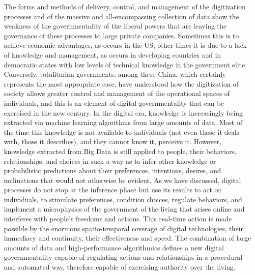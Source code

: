 The forms and methods of delivery, control, and management of the digitization processes and of the massive and all-encompassing collection of data show the weakness of the governmentality of the liberal powers that are leaving the governance of these processes to large private companies. Sometimes this is to achieve economic advantages, as occurs in the US, other times it is due to a lack of knowledge and management, as occurs in developing countries and in democratic states with low levels of technical knowledge in the government elite. Conversely, totalitarian governments, among these China, which certainly represents the most appropriate case, have understood how the digitization of society allows greater control and management of the operational spaces of individuals, and this is an element of digital governmentality that can be exercised in the new century. In the digital era, knowledge is increasingly being extracted via machine learning algorithms from large amounts of data. Most of the time this knowledge is not available to individuals (not even those it deals with, those it describes), and they cannot know it, perceive it. However, knowledge extracted from Big Data is still applied to people, their behaviors, relationships, and choices in such a way as to infer other knowledge or probabilistic predictions about their preferences, intentions, desires, and inclinations that would not otherwise be evident. As we have discussed, digital processes do not stop at the inference phase but use its results to act on individuals, to stimulate preferences, condition choices, regulate behaviors, and implement a microphysics of the government of the living that arises online and interferes with people's freedoms and actions. This real-time action is made possible by the enormous spatio-temporal coverage of digital technologies, their immediacy and continuity, their effectiveness and speed. The combination of large amounts of data and high-performance algorithmics defines a new digital governmentality capable of regulating actions and relationships in a procedural and automated way, therefore capable of exercising authority over the living.

